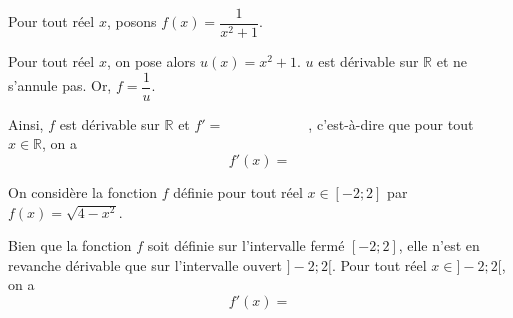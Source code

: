 \documentclass[11pt,fleqn, openany]{book} %
\begin{document}
\begin{example}Pour tout réel $x$, posons $f(x)=\dfrac{1}{x^2+1}$. 

Pour tout réel $x$, on pose alors $u(x)=x^2+1$. $u$ est dérivable sur $\mathbb{R}$ et ne s'annule pas. Or, $f=\dfrac{1}{u}$.

 Ainsi, $f$ est dérivable sur $\mathbb{R}$ et $f'=\qquad\qquad\qquad $, c'est-à-dire que pour tout $x\in \mathbb{R}$, on a
\[ f'(x)=\]\end{example}

\begin{example}On considère la fonction $f$ définie pour tout réel $x\in[-2;2]$ par $f(x)=\sqrt{4-x^2}$.

Bien que la fonction $f$ soit définie sur l'intervalle fermé $[-2;2]$, elle n'est en revanche dérivable que sur l'intervalle ouvert $]-2;2[$. Pour tout réel $x\in]-2;2[$, on a
\[f'(x)=\]\end{example}
\end{document}

